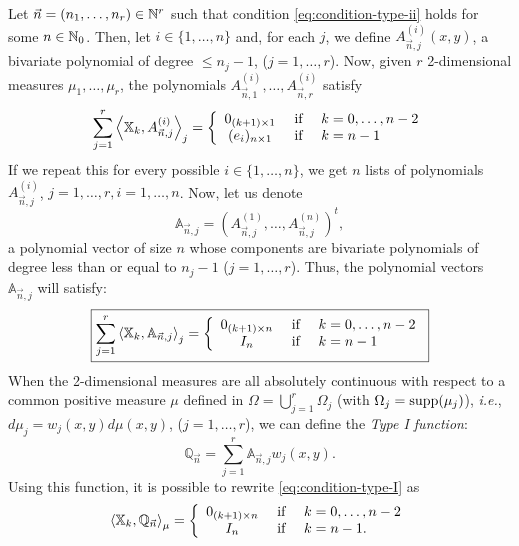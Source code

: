 \documentclass[portrait,final,a0paper,fontscale=0.38]{baposter}
\begin{document}
\begin{poster}
{
\begin{multicols}{2}
  Let $\vec n = (n_1,\dots,n_r)\in\mathbb{N}^r$ such that condition \eqref{eq:condition-type-ii} holds for some $n\in\mathbb{N}_0$. Then, let $i\in\{1,\dots,n\}$ and, for each $j$, we define $A_{\vec n, j}^{(i)}(x,y)$, a bivariate polynomial of degree $\leq n_j-1$, ($j=1,\dots,r$). Now, given $r$ 2-dimensional measures $\mu_1,\dots,\mu_r$, the polynomials $A_{\vec n, 1}^{(i)}, \dots, A_{\vec n, r}^{(i)}$ satisfy
\begin{equation}
    \label{eq:first-condition-type-I}
    \sum_{j=1}^r \left\langle \mathbb X_k , A_{\vec n,j}^{(i)} \right\rangle_j = \left\{\begin{array}{ccl}
        0_{(k+1)\times 1} &   \text{ if } & k=0,\dots,n-2 \\
        (e_i)_{n\times 1}  & \text{ if } & k=n-1      
    \end{array}\right.
\end{equation}
If we repeat this for every possible $i\in\{1,\dots,n\}$, we get $n$ lists of polynomials $A_{\vec n, j}^{(i)}$, $j=1,\dots,r, i=1,\dots,n$. Now, let us denote
$$
\mathbb A_{\vec n,j} = (A_{\vec n, j}^{(1)}, \dots, A_{\vec n, j}^{(n)})^t,
$$
a polynomial vector of size $n$ whose components are bivariate polynomials of degree less than or equal to $n_j-1$ ($j=1,\dots,r$). Thus, the polynomial vectors $\mathbb A_{\vec n,j}$ will satisfy:
\begin{equation}
    \label{eq:condition-type-I}
    \boxed{\sum_{j=1}^r \left\langle \mathbb X_k , \mathbb A_{\vec n,j} \right\rangle_j = \left\{\begin{array}{ccl}
        0_{(k+1)\times n} &   \text{ if } & k=0,\dots,n-2 \\
        I_n & \text{ if } & k=n-1      
    \end{array}\right.}
\end{equation}
When the 2-dimensional measures are all absolutely continuous with respect to a common positive measure $\mu$ defined in \linebreak$\Omega = \displaystyle\bigcup_{j=1}^r \Omega_j$ (with $\Omega_j=\mathrm{supp}(\mu_j)$), \textit{i.e.}, $d\mu_j = w_j(x,y)d\mu(x,y)$, ($j=1,\dots,r$), we can define the \textit{Type I function}:
\begin{equation}
    \label{eq:type-I-function-2-vars}
    \mathbb Q_{\vec n} = \sum_{j=1}^r \mathbb A_{\vec n,j}w_j(x,y).
\end{equation}
Using this function, it is possible to rewrite \eqref{eq:condition-type-I} as
\begin{equation}
    \left\langle \mathbb X_k , \mathbb Q_{\vec n} \right\rangle_\mu = \left\{\begin{array}{ccl}
        0_{(k+1)\times n} &   \text{ if } & k=0,\dots,n-2 \\
        I_n & \text{ if } & k=n-1.
    \end{array}\right.     
\end{equation}


\end{multicols}}
\end{poster}
\end{document}
